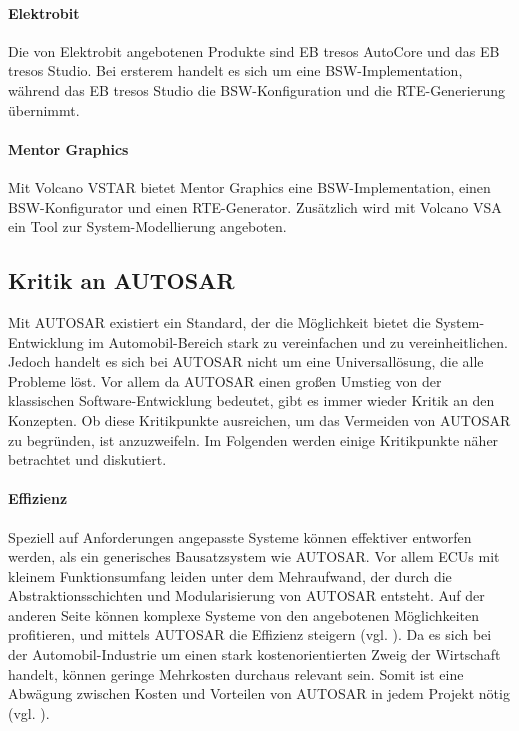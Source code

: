 \documentclass[
  a4paper,					    %
  twoside,
  DIV=calc,     				%
  bibliography=totoc,
  cleardoublepage=empty,
  ngerman,     					%
  final       					%
]{scrbook}
\begin{document}
\paragraph{Elektrobit}
Die von Elektrobit angebotenen Produkte sind EB tresos AutoCore und das EB tresos Studio. Bei ersterem handelt es sich um eine BSW-Implementation, während das EB tresos Studio die BSW-Konfiguration und die RTE-Generierung übernimmt.

\paragraph{Mentor Graphics}
Mit Volcano VSTAR bietet Mentor Graphics eine BSW-Implementation, einen BSW-Konfigurator und einen RTE-Generator. Zusätzlich wird mit Volcano VSA ein Tool zur System-Modellierung angeboten.




\subsection{Kritik an AUTOSAR}
\label{sec:kritik_autosar}
Mit AUTOSAR existiert ein Standard, der die Möglichkeit bietet die System-Entwicklung im Automobil-Bereich stark zu vereinfachen und zu vereinheitlichen. Jedoch handelt es sich bei AUTOSAR nicht um eine Universallösung, die alle Probleme löst. Vor allem da AUTOSAR einen großen Umstieg von der klassischen Software-Entwicklung bedeutet, gibt es immer wieder Kritik an den Konzepten. Ob diese Kritikpunkte ausreichen, um das Vermeiden von AUTOSAR zu begründen, ist anzuzweifeln. Im Folgenden werden einige Kritikpunkte näher betrachtet und diskutiert.

\paragraph{Effizienz}
Speziell auf Anforderungen angepasste Systeme können effektiver entworfen werden, als ein generisches Bausatzsystem wie AUTOSAR. Vor allem ECUs mit kleinem Funktionsumfang leiden unter dem Mehraufwand, der durch die Abstraktionsschichten und Modularisierung von AUTOSAR entsteht. Auf der anderen Seite können komplexe Systeme von den angebotenen Möglichkeiten profitieren, und mittels AUTOSAR die Effizienz steigern (vgl. \cite{as_kritik}\cite{wiki:autosar}). Da es sich bei der Automobil-Industrie um einen stark kostenorientierten Zweig der Wirtschaft handelt, können geringe Mehrkosten durchaus relevant sein. Somit ist eine Abwägung zwischen Kosten und Vorteilen von AUTOSAR in jedem Projekt nötig (vgl. \cite[Seite 152]{SE_Autosar}).
\end{document}
